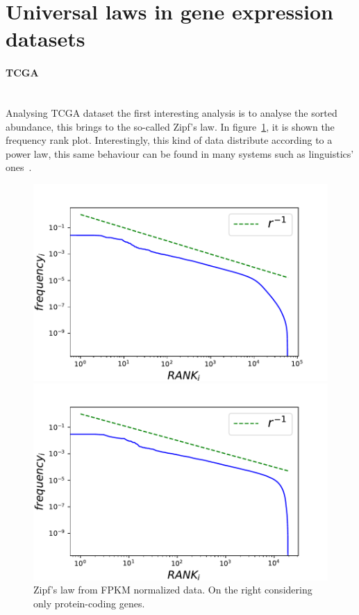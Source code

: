 \section{Universal laws in gene expression datasets}\label{sec:universallaws}
\paragraph{TCGA}\mbox{} \\
Analysing TCGA dataset the first interesting analysis is to analyse the sorted abundance, this brings to the so-called Zipf's law.
In figure~\ref{fig:structure/tcga/globalZipf}, it is shown the frequency rank plot. Interestingly, this kind of data distribute according to a power law, this same behaviour can be found in many systems such as linguistics' ones~\cite{altmann2016statistical}.
\begin{figure}[htb!]
	\centering
	\begin{minipage}{0.45\textwidth}
		\includegraphics[width=0.95\linewidth]{pictures/structure/tcga/globalzipf_fpkmall.pdf}
	\end{minipage}
	\hspace{3mm}
	\begin{minipage}{0.45\textwidth}
		\includegraphics[width=0.95\linewidth]{pictures/structure/tcga/globalzipf_fpkm.pdf}
	\end{minipage}
	\caption{Zipf's law from FPKM normalized data. On the right considering only protein-coding genes.}
	\label{fig:structure/tcga/globalZipf}
\end{figure}
